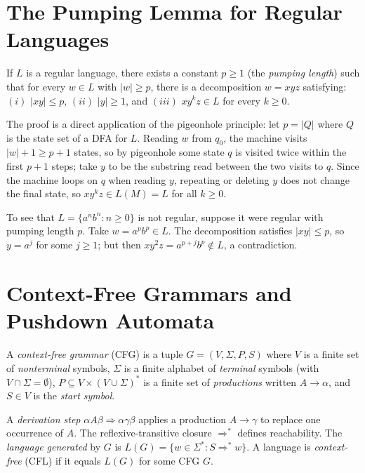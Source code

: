 \section{The Pumping Lemma for Regular Languages}

\begin{theorem}
If $L$ is a regular language, there exists a constant $p \ge 1$ (the \emph{pumping length}) such that for every $w \in L$ with $|w| \ge p$, there is a decomposition $w = xyz$ satisfying: $(i)$ $|xy| \le p$, $(ii)$ $|y| \ge 1$, and $(iii)$ $xy^k z \in L$ for every $k \ge 0$.
\end{theorem}

The proof is a direct application of the pigeonhole principle: let $p = |Q|$ where $Q$ is the state set of a DFA for $L$. Reading $w$ from $q_0$, the machine visits $|w|+1 \ge p+1$ states, so by pigeonhole some state $q$ is visited twice within the first $p+1$ steps; take $y$ to be the substring read between the two visits to $q$. Since the machine loops on $q$ when reading $y$, repeating or deleting $y$ does not change the final state, so $xy^kz \in L(M) = L$ for all $k \ge 0$.

To see that $L = \{a^n b^n : n \ge 0\}$ is not regular, suppose it were regular with pumping length $p$. Take $w = a^p b^p \in L$. The decomposition satisfies $|xy| \le p$, so $y = a^j$ for some $j \ge 1$; but then $xy^2 z = a^{p+j}b^p \notin L$, a contradiction.

\section{Context-Free Grammars and Pushdown Automata}

\begin{definition}
A \emph{context-free grammar} (CFG) is a tuple $G = (V, \Sigma, P, S)$ where $V$ is a finite set of \emph{nonterminal} symbols, $\Sigma$ is a finite alphabet of \emph{terminal} symbols (with $V \cap \Sigma = \emptyset$), $P \subseteq V \times (V \cup \Sigma)^*$ is a finite set of \emph{productions} written $A \to \alpha$, and $S \in V$ is the \emph{start symbol}.
\end{definition}

A \emph{derivation step} $\alpha A \beta \Rightarrow \alpha \gamma \beta$ applies a production $A \to \gamma$ to replace one occurrence of $A$. The reflexive-transitive closure $\Rightarrow^*$ defines reachability. The \emph{language generated} by $G$ is $L(G) = \{w \in \Sigma^* : S \Rightarrow^* w\}$. A language is \emph{context-free} (CFL) if it equals $L(G)$ for some CFG $G$.

